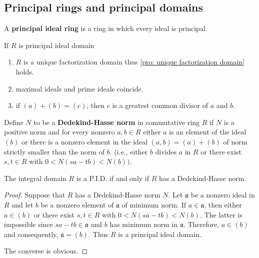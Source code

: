 \subsection{Principal rings and principal domains} %

\begin{definition}
    A \textbf{principal ideal ring} is a ring in which every ideal is principal.
\end{definition}

\begin{theorem}
    If $R$ is principal ideal domain
    \begin{enumerate}[resume]
        \item
              $R$ is a unique factorization domain thus
              \cref{pro: unique factorization domain} holds.
        \item
              maximal ideals and prime ideals coincide.
              \item  if $\left(a\right)+\left(b\right)=\left(c\right)$, then $c$ is a greatest common divisor of $a$ and $b$.
    \end{enumerate}
\end{theorem}




\begin{definition}
    Define $N$ to be a \textbf{Dedekind-Hasse norm} in commutative ring $R$ if $N$ is a positive norm and for every nonzero $a, b \in R$ either $a$ is an element of the ideal  $\left(b\right)$ or there is a nonzero element in the ideal $(a, b)=\left(a\right)+\left(b\right)$ of norm strictly smaller than the norm of $b$. (i.e., either $b$ divides $a$ in $R$ or there exist $s, t \in R$ with $0<N(s a-t b)<N(b))$.
\end{definition}

\begin{theorem}
    The integral domain $R$ is a P.I.D. if and only if $R$ has a Dedekind-Hasse norm.

    \begin{proof}
        Suppose that $R$ has a Dedekind-Hasse norm $N$. 
        Let $\mathfrak{a}$ be a nonzero ideal in $R$ and let $b$ be a nonzero element of $\mathfrak{a}$ of minimum norm. If $a \in \mathfrak{a}$, then either $a \in (b)$ or there exist $s, t \in R$ with $0<N(s a-t b)<N(b)$. The latter is impossible since $s a-t b \in \mathfrak{a}$ and $b$ has minimum norm in $\mathfrak{a}$. Therefore, $a \in (b)$ and consequently, $\mathfrak{a}=(b)$. Thus $R$ is a principal ideal domain.

        The converse is obvious.
    \end{proof}
\end{theorem}


